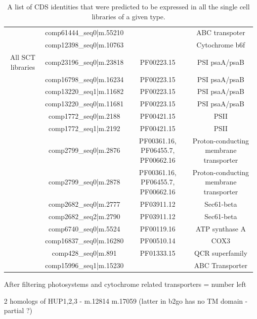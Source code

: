 \begin{table}
\begin{tabular}{|c|c|c|c|}
                            & comp61444\_seq0|m.55210 & & ABC transpoter \\
                            & comp12398\_seq0|m.10763 & & Cytochrome b6f \\
        \hline
        All SCT libraries   & comp23196\_seq0|m.23818 & PF00223.15 & PSI psaA/psaB \\
                            &  comp16798\_seq0|m.16234 & PF00223.15 & PSI psaA/psaB \\
                            &  comp13220\_seq1|m.11682 & PF00223.15 & PSI psaA/psaB \\
                            &  comp13220\_seq0|m.11681 & PF00223.15 & PSI psaA/psaB \\ 
                            &  comp1772\_seq0|m.2188  & PF00421.15 & PSII \\
                            &  comp1772\_seq1|m.2192 & PF00421.15 & PSII \\
                            &  comp2799\_seq0|m.2876  & PF00361.16, PF06455.7, PF00662.16 & Proton-conducting membrane transporter\\ %
                            &  comp2799\_seq0|m.2878 & PF00361.16, PF06455.7, PF00662.16 & Proton-conducting membrane transporter\\ %
                            &  comp2682\_seq0|m.2777& PF03911.12 & Sec61-beta \\
                            &  comp2682\_seq2|m.2790& PF03911.12 & Sec61-beta \\
                            &  comp6740\_seq0|m.5524& PF00119.16 & ATP synthase A \\
                            &  comp16837\_seq0|m.16280& PF00510.14 & COX3 \\
                            &  comp428\_seq0|m.891& PF01333.15 & QCR superfamily \\
                            &  comp15996\_seq1|m.15230 & & ABC Transporter \\
        \hline
    \end{tabular}
    \caption{A list of CDS identities that were predicted to be expressed in all the single cell
    libraries of a given type.}
    \label{tab:consensus_transporters}
\end{table}

After filtering photosystems and cytochrome related transporters = number left


2 homologs of HUP1,2,3 - m.12814 m.17059 (latter in b2go has no TM domain - partial ?)


